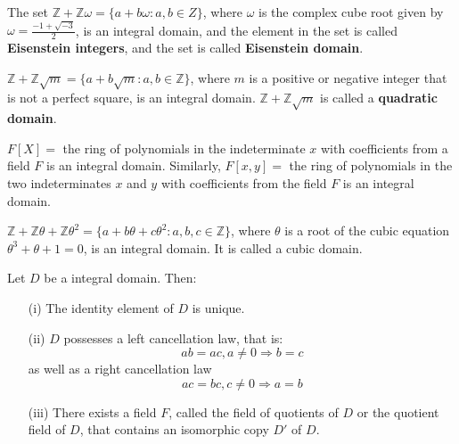 \begin{example} The set $\mathbb{Z}+\mathbb{Z}\omega=\{a+b\omega: a,b \in Z\}$, where $\omega$ is the complex cube root given by $\omega=\frac{-1+\sqrt{-3}}{2}$, is an integral domain, and the element in the set is called {\bf Eisenstein integers}, and the set is called {\bf Eisenstein domain}.
\end{example}

\begin{example} $\mathbb{Z}+\mathbb{Z}\sqrt{m} =\{a+b\sqrt{m}: a,b \in \mathbb{Z}\}$, where $m$ is a positive or negative integer that is not a perfect square, is an integral domain. $\mathbb{Z}+\mathbb{Z}\sqrt{m}$ is called a {\bf quadratic domain}.
\end{example}

\begin{example} $F[X]=$ the ring of polynomials in the indeterminate $x$ with coefficients from a field $F$ is an integral domain. Similarly, $F[x,y]=$ the ring of polynomials in the two indeterminates $x$ and $y$ with coefficients from the field $F$ is an integral domain.
\end{example}

\begin{example} 
$\mathbb{Z}+\mathbb{Z}\theta+\mathbb{Z}\theta^2=\{a+b\theta+c\theta^2: a,b,c \in \mathbb{Z}\}$, where $\theta$ is a root of the cubic equation $\theta^3+\theta+1=0$, is an integral domain. It is called a cubic domain.
\end{example}

\begin{lemma} Let $D$ be a integral domain. Then:
\begin{enumerate}
\item[(i)] The identity element of $D$ is unique.
\item[(ii)] $D$ possesses a left cancellation law, that is:
$$ab=ac, a \neq 0 \Rightarrow b=c$$ as well as a right cancellation law $$ac=bc,c \neq 0 \Rightarrow a=b$$
\item[(iii)] There exists a field $F$, called the field of quotients of $D$ or the quotient field of $D$, that contains an isomorphic copy $D'$ of $D$.
\end{enumerate}
\end{lemma}

